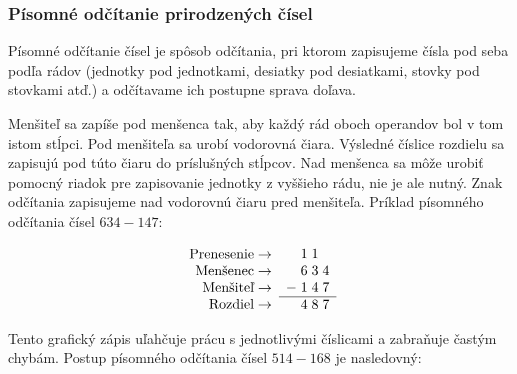\documentclass{report}
\begin{document}
\subsubsection{Písomné odčítanie prirodzených čísel}

Písomné odčítanie čísel je spôsob odčítania, pri ktorom zapisujeme čísla pod seba podľa rádov (jednotky pod jednotkami, desiatky pod desiatkami, stovky pod stovkami atď.) a odčítavame ich postupne sprava doľava.

Menšiteľ sa zapíše pod menšenca tak, aby každý rád oboch operandov bol v tom istom stĺpci. Pod menšiteľa sa urobí vodorovná čiara. Výsledné číslice rozdielu sa zapisujú pod túto čiaru do príslušných stĺpcov. Nad menšenca sa môže urobiť pomocný riadok pre zapisovanie jednotky z vyššieho rádu, nie je ale nutný. Znak odčítania zapisujeme nad vodorovnú čiaru pred menšiteľa. Príklad písomného odčítania čísel \(634 - 147\):
\begin{table}[H]
  \centering
  \[
  \begin{array}{r}
    \text{Prenesenie} \rightarrow \\
    \text{Menšenec} \rightarrow \\
    \text{Menšiteľ} \rightarrow \\
    \text{Rozdiel} \rightarrow \\
  \end{array}
  \begin{array}{c@{\;}c@{\;}c@{\;}c}
      & 1 & 1 &  \\
      & 6 & 3 & 4 \\
    - & 1 & 4 & 7 \\
    \hline
      & 4 & 8 & 7
  \end{array}
  \]
\end{table}

Tento grafický zápis uľahčuje prácu s jednotlivými číslicami a zabraňuje častým chybám. Postup písomného odčítania čísel \(514 - 168\) je nasledovný:
\end{document}
